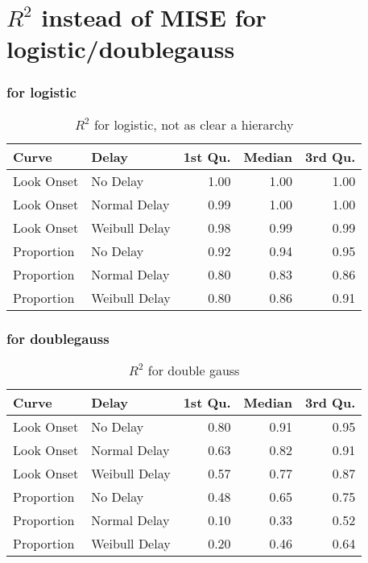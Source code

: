 \section{$R^2$ instead of MISE for logistic/doublegauss}


\subsubsection{for logistic}

\begin{table}[H]
\centering
\begin{tabular}{llrrr}
  \hline
Curve & Delay & 1st Qu. & Median & 3rd Qu. \\ 
  \hline
Look Onset & No Delay & 1.00 & 1.00 & 1.00 \\ 
  Look Onset & Normal Delay & 0.99 & 1.00 & 1.00 \\ 
  Look Onset & Weibull Delay & 0.98 & 0.99 & 0.99 \\ 
  Proportion & No Delay & 0.92 & 0.94 & 0.95 \\ 
  Proportion & Normal Delay & 0.80 & 0.83 & 0.86 \\ 
  Proportion & Weibull Delay & 0.80 & 0.86 & 0.91 \\ 
   \hline
\end{tabular}
\caption{$R^2$ for logistic, not as clear a hierarchy}
\label{tab:r2_logistic_sims}
\end{table}

\subsubsection{for doublegauss}

\begin{table}[H]
\centering
\begin{tabular}{llrrr}
  \hline
Curve & Delay & 1st Qu. & Median & 3rd Qu. \\ 
  \hline
Look Onset & No Delay & 0.80 & 0.91 & 0.95 \\ 
  Look Onset & Normal Delay & 0.63 & 0.82 & 0.91 \\ 
  Look Onset & Weibull Delay & 0.57 & 0.77 & 0.87 \\ 
  Proportion & No Delay & 0.48 & 0.65 & 0.75 \\ 
  Proportion & Normal Delay & 0.10 & 0.33 & 0.52 \\ 
  Proportion & Weibull Delay & 0.20 & 0.46 & 0.64 \\ 
   \hline
\end{tabular}
\caption{$R^2$ for double gauss}
\label{tab:r2_dg_sims}
\end{table}
